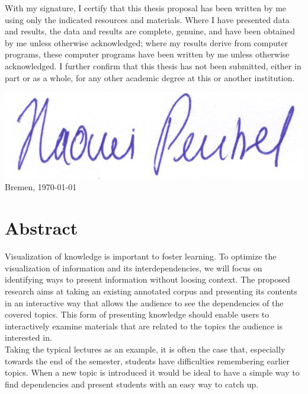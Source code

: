 \documentclass[twoside, 12pt]{article}
\begin{document}
\newpage
\noindent
  With my signature, I certify that this thesis proposal has been written by me
  using only the indicated resources and materials. Where I have
  presented data and results, the data and results are complete,
  genuine, and have been obtained by me unless otherwise acknowledged;
  where my results derive from computer programs, these computer
  programs have been written by me unless otherwise acknowledged. I
  further confirm that this thesis has not been submitted, either in
  part or as a whole, for any other academic degree at this or another
  institution.

  \vspace{20mm}

    \includegraphics[scale=0.2]{assets/Signature}
 \hfill Bremen, \today
  
\newpage

\thispagestyle{fancy} %


 \section*{Abstract}
 \label{sec:abstract}
Visualization of knowledge is important to foster learning. To optimize the visualization of information and its interdependencies, we will focus on identifying ways to present information without loosing context. The proposed research aims at taking an existing annotated corpus and presenting its contents in an interactive way that allows the audience to see the dependencies of the covered topics. This form of presenting knowledge should enable users to interactively examine materials that are related to the topics the audience is interested in.\\

Taking the typical lectures as an example, it is often the case that, especially towards the end of the semester, students have difficulties remembering earlier topics. When a new topic is introduced it would be ideal to have a simple way to find dependencies and present students with an easy way to catch up.\\
\end{document}
